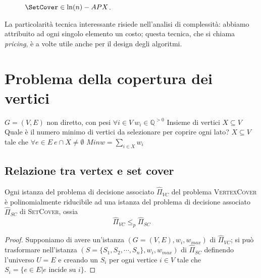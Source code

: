 \begin{figure}[h]
	\caption{$\SetCover \in \ln(n)-APX$.}
	\label{fig:setcoverapx}
\end{figure}

La particolarità tecnica interessante risiede nell'analisi di complessità:
abbiamo attribuito ad ogni singolo elemento un costo; questa tecnica, che
si chiama \textit{pricing}, è a volte utile anche per il design degli algoritmi.

\section{Problema della copertura dei vertici}
 {$G = (V,E)$ non diretto, con pesi
	$\forall i \in V ~ w_i \in \mathbb{Q}^{>0}$}
{Insieme di vertici $X \subseteq V$}
{Quale è il numero minimo di vertici da selezionare per coprire ogni lato?}
{$X \subseteq V$ tale che $\forall e \in E ~ e \cap X \neq \emptyset$}
{$Min$}{$w = \sum_{i \in X} w_i$}

\subsection{Relazione tra vertex e set cover}
\begin{theorem}\label{thm:vc_polyred_sc}
	Ogni istanza del problema di decisione associato $\hat{\Pi}_{VC}$ del problema \textsc{VertexCover} è
	polinomialmente riducibile ad una istanza del problema di decisione associato
	$\hat{\Pi}_{SC}$ di \textsc{SetCover}, ossia
	$$
		\hat{\Pi}_{VC} \leq_p \hat{\Pi}_{SC}
	$$
\end{theorem}
\begin{proof}
	Supponiamo di avere un'istanza $(G=(V,E), w_i, w_{max})$ di
	$\hat{\Pi}_{VC}$; si può trasformare nell'istanza
	$(S= \{S_1, S_2, \cdots, S_n\}, w_i, w_{max})$ di $\hat{\Pi}_{SC}$ 
	definendo l'universo $U=E$ e creando un $S_i$ per ogni vertice $i \in V$ tale che 
	$S_i = \{e \in E | e \text{ incide su } i\}$.
\end{proof}

